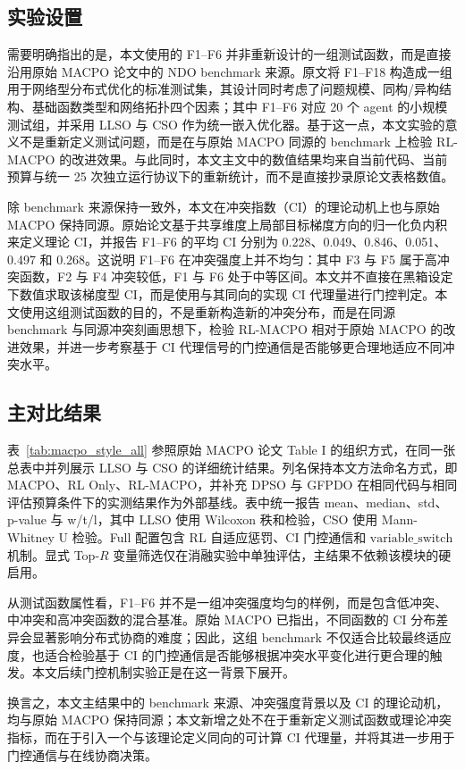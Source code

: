 \documentclass[conference]{IEEEtran}
\begin{document}
\subsection{实验设置}
需要明确指出的是，本文使用的 F1--F6 并非重新设计的一组测试函数，而是直接沿用原始 MACPO 论文中的 NDO benchmark 来源。原文将 F1--F18 构造成一组用于网络型分布式优化的标准测试集，其设计同时考虑了问题规模、同构/异构结构、基础函数类型和网络拓扑四个因素；其中 F1--F6 对应 20 个 agent 的小规模测试组，并采用 LLSO 与 CSO 作为统一嵌入优化器。基于这一点，本文实验的意义不是重新定义测试问题，而是在与原始 MACPO 同源的 benchmark 上检验 RL-MACPO 的改进效果。与此同时，本文主文中的数值结果均来自当前代码、当前预算与统一 25 次独立运行协议下的重新统计，而不是直接抄录原论文表格数值。

除 benchmark 来源保持一致外，本文在冲突指数（CI）的理论动机上也与原始 MACPO 保持同源。原始论文基于共享维度上局部目标梯度方向的归一化负内积来定义理论 CI，并报告 F1--F6 的平均 CI 分别为 0.228、0.049、0.846、0.051、0.497 和 0.268。这说明 F1--F6 在冲突强度上并不均匀：其中 F3 与 F5 属于高冲突函数，F2 与 F4 冲突较低，F1 与 F6 处于中等区间。本文并不直接在黑箱设定下数值求取该梯度型 CI，而是使用与其同向的实现 CI 代理量进行门控判定。本文使用这组测试函数的目的，不是重新构造新的冲突分布，而是在同源 benchmark 与同源冲突刻画思想下，检验 RL-MACPO 相对于原始 MACPO 的改进效果，并进一步考察基于 CI 代理信号的门控通信是否能够更合理地适应不同冲突水平。
\subsection{主对比结果}

表~\ref{tab:macpo_style_all} 参照原始 MACPO 论文 Table I 的组织方式，在同一张总表中并列展示 LLSO 与 CSO 的详细统计结果。列名保持本文方法命名方式，即 MACPO、RL Only、RL-MACPO，并补充 DPSO 与 GFPDO 在相同代码与相同评估预算条件下的实测结果作为外部基线。表中统一报告 mean、median、std、p-value 与 w/t/l，其中 LLSO 使用 Wilcoxon 秩和检验，CSO 使用 Mann-Whitney U 检验。Full 配置包含 RL 自适应惩罚、CI 门控通信和 $\mathrm{variable\_switch}$ 机制。显式 Top-$R$ 变量筛选仅在消融实验中单独评估，主结果不依赖该模块的硬启用。

从测试函数属性看，F1--F6 并不是一组冲突强度均匀的样例，而是包含低冲突、中冲突和高冲突函数的混合基准。原始 MACPO 已指出，不同函数的 CI 分布差异会显著影响分布式协商的难度；因此，这组 benchmark 不仅适合比较最终适应度，也适合检验基于 CI 的门控通信是否能够根据冲突水平变化进行更合理的触发。本文后续门控机制实验正是在这一背景下展开。

换言之，本文主结果中的 benchmark 来源、冲突强度背景以及 CI 的理论动机，均与原始 MACPO 保持同源；本文新增之处不在于重新定义测试函数或理论冲突指标，而在于引入一个与该理论定义同向的可计算 CI 代理量，并将其进一步用于门控通信与在线协商决策。
\end{document}
